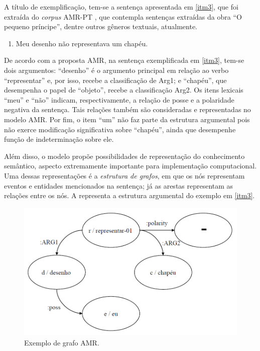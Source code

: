 A título de exemplificação, tem-se a sentença apresentada em \ref{itm3}, que
foi extraída do \emph{corpus} AMR-PT \cite{inacio2023}, que
contempla sentenças extraídas da obra ``O pequeno príncipe'', dentre
outros gêneros textuais, atualmente.

\begin{enumerate}[start=3,label={(\arabic{enumi})}]
    \item\label{itm3} Meu desenho não representava um chapéu.
\end{enumerate}

De acordo com a proposta AMR, na sentença exemplificada em \ref{itm3}, tem-se
dois argumentos: ``desenho'' é o argumento principal em relação ao verbo
``representar'' e, por isso, recebe a classificação de Arg1; e
``chapéu'', que desempenha o papel de ``objeto'', recebe a classificação
Arg2. Os itens lexicais ``meu'' e ``não'' indicam, respectivamente, a
relação de posse e a polaridade negativa da sentença. Tais relações
também são consideradas e representadas no modelo AMR. Por fim, o item
``um'' não faz parte da estrutura argumental pois não exerce modificação
significativa sobre ``chapéu'', ainda que desempenhe função de
indeterminação sobre ele.

Além disso, o modelo propõe possibilidades de representação do
conhecimento semântico, aspecto extremamente importante para
implementação computacional. Uma dessas representações é a
\emph{estrutura de grafos}, em que os nós representam eventos e
entidades mencionados na sentença; já as arestas representam as relações
entre os nós. A  representa a estrutura argumental do exemplo em \ref{itm3}.

\begin{figure}[h]
  \centering    
  \begin{minipage}{.75\textwidth}
  \includegraphics[width=\textwidth]{figure01.png}
  \caption{Exemplo de grafo AMR.}
  \label{fig-01}
  \end{minipage}
\end{figure}

